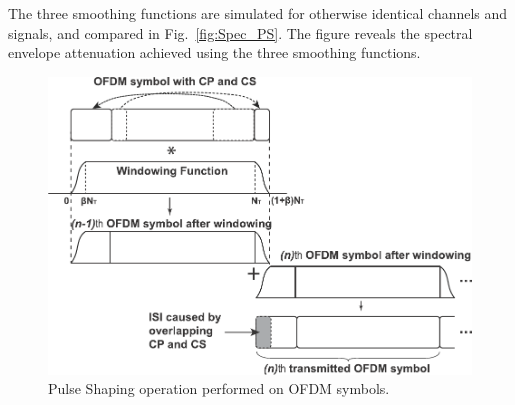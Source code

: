 The three smoothing functions are simulated for otherwise identical channels and signals, and compared in Fig.~\ref{fig:Spec_PS}. The figure reveals the spectral envelope attenuation achieved using the three smoothing functions. %

\begin{figure}[t]
    \centerline{\includegraphics [width=0.7\columnwidth] {Figures/w-ofdm} }
	\vspace{-2mm}
    \caption{Pulse Shaping operation performed on OFDM symbols.}
    \label{fig:PS}
\end{figure}


